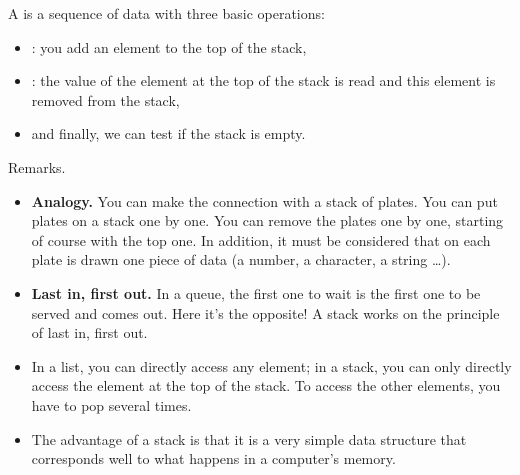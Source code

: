\documentclass[11pt,class=report,crop=false]{standalone}
\begin{document}



\begin{cours}[Stack]

  A  is a sequence of data with three basic operations:
  \begin{itemize}
    \item {}: you add an element to the top of the stack,
    \item {}: the value of the element at the top of the stack is read and this element is removed from the stack,
    \item and finally, we can test if the stack is empty.
  \end{itemize}  



Remarks.
\begin{itemize}
  \item \textbf{Analogy.} You can make the connection with a stack of plates. You can put plates on a stack one by one. You can remove the plates one by one, starting of course with the top one. In addition, it must be considered that on each plate is drawn one piece of data (a number, a character, a string \ldots).

  \item \textbf{Last in, first out.} 
  In a queue, the first one to wait is the first one to be served and comes out. Here it's the opposite! A stack works on the principle of \og{}last in, first out\fg{}.
  
  \item In a list, you can directly access any element; in a stack, you can only directly access the element at the top of the stack. To access the other elements, you have to pop several times.
  
  \item The advantage of a stack is that it is a very simple data structure that corresponds well to what happens in a computer's memory.
\end{itemize}
\end{cours}
\end{document}
